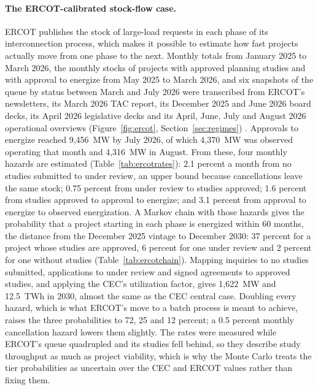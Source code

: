 \paragraph{The ERCOT-calibrated stock-flow case.} ERCOT publishes the stock of large-load requests in each phase of its interconnection process, which makes it possible to estimate how fast projects actually move from one phase to the next. Monthly totals from January 2025 to March 2026, the monthly stocks of projects with approved planning studies and with approval to energize from May 2025 to March 2026, and six snapshots of the queue by status between March and July 2026 were transcribed from ERCOT's newsletters, its March 2026 TAC report, its December 2025 and June 2026 board decks, its April 2026 legislative decks and its April, June, July and August 2026 operational overviews (Figure~\ref{fig:ercot}, Section~\ref{sec:regimes}) \citep{ercot_tac2026,ercot_monthly2025,ercot_board2026,ercot_ops2026}. Approvals to energize reached 9,456~MW by July 2026, of which 4,370~MW was observed operating that month and 4,316~MW in August. From these, four monthly hazards are estimated (Table~\ref{tab:ercotrates}): 2.1 percent a month from no studies submitted to under review, an upper bound because cancellations leave the same stock; 0.75 percent from under review to studies approved; 1.6 percent from studies approved to approval to energize; and 3.1 percent from approval to energize to observed energization. A Markov chain with those hazards gives the probability that a project starting in each phase is energized within 60 months, the distance from the December 2025 vintage to December 2030: 37 percent for a project whose studies are approved, 6 percent for one under review and 2 percent for one without studies (Table~\ref{tab:ercotchain}). Mapping inquiries to no studies submitted, applications to under review and signed agreements to approved studies, and applying the CEC's utilization factor, gives 1,622~MW and 12.5~TWh in 2030, almost the same as the CEC central case. Doubling every hazard, which is what ERCOT's move to a batch process is meant to achieve, raises the three probabilities to 72, 25 and 12 percent; a 0.5 percent monthly cancellation hazard lowers them slightly. The rates were measured while ERCOT's queue quadrupled and its studies fell behind, so they describe study throughput as much as project viability, which is why the Monte Carlo treats the tier probabilities as uncertain over the CEC and ERCOT values rather than fixing them.

\begin{table}[H]
\centering\footnotesize
\caption{Monthly phase-transition hazards estimated from the ERCOT large-load queue. Source: ERCOT TAC report March 2026 (slide 4), ERCOT Monthly November 2025, TAC snapshot of March 13 2026.}
\label{tab:ercotrates}
\resizebox{\textwidth}{!}{}
\end{table}

